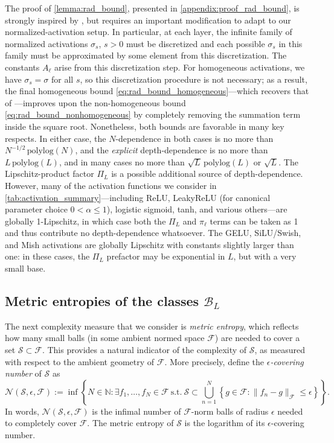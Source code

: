 \documentclass{article}
\def\cB{{\mathcal{B}}}
\def\cF{{\mathcal{F}}}
\def\cN{{\mathcal{N}}}
\def\cS{{\mathcal{S}}}
\def\bN{{\mathbb{N}}}
\begin{document}
The proof of \cref{lemma:rad_bound}, presented in \cref{appendix:proof_rad_bound}, is strongly inspired by \cite{golowich2018size}, but requires an important modification to adapt to our normalized-activation setup. In particular, at each layer, the infinite family of normalized activations $\sigma_s$, $s > 0$ must be discretized and each possible $\sigma_s$ in this family must be approximated by some element from this discretization. The constants $A_\ell$ arise from this discretization step. For homogeneous activations, we have $\sigma_s = \sigma$ for all $s$, so this discretization procedure is not necessary; as a result, the final homogeneous bound \eqref{eq:rad_bound_homogeneous}---which recovers that of \cite{golowich2018size}---improves upon the non-homogeneous bound \eqref{eq:rad_bound_nonhomogeneous} by completely removing the summation term inside the square root. Nonetheless, both bounds are favorable in many key respects. In either case, the $N$-dependence in both cases is no more than $N^{-1/2} \, \mathrm{polylog}(N)$, and the \textit{explicit} depth-dependence is no more than $L \, \mathrm{polylog}(L)$, and in many cases no more than $\sqrt{L} \, \mathrm{polylog}(L)$ or $\sqrt{L}$. The Lipschitz-product factor $\Pi_L$ is a possible additional source of depth-dependence. However, many of the activation functions we consider in \cref{tab:activation_summary}---including ReLU, LeakyReLU (for canonical parameter choice $0 < \alpha \leq 1$), logistic sigmoid, tanh, and various others---are globally 1-Lipschitz, in which case both the $\Pi_L$ and $\pi_\ell$ terms can be taken as 1 and thus contribute no depth-dependence whatsoever. The GELU, SiLU/Swish, and Mish activations are globally Lipschitz with constants slightly larger than one: in these cases, the $\Pi_L$ prefactor may be exponential in $L$, but with a very small base.

\subsection{Metric entropies of the classes $\cB_L$} \label{sec:metric_entropy}
The next complexity measure that we consider is \textit{metric entropy}, which reflects how many small balls (in some ambient normed space $\cF$) are needed to cover a set $\cS \subset \cF$. This provides a natural indicator of the complexity of $\cS$, as measured with respect to the ambient geometry of $\cF$. More precisely, define the \textit{$\epsilon$-covering number} of $\cS$ as
\begin{equation} \label{eq:covering_number}
    \cN(\cS, \epsilon, \cF) := \inf \left\{ N \in \bN: \exists f_1, \dots, f_N \in \cF \ \textrm{s.t.} \ \cS \subset \bigcup_{n=1}^N \left\{ g \in \cF: \| f_n - g \|_{\cF} \leq \epsilon \right\} \right\}.
\end{equation}
In words, $\cN(\cS, \epsilon, \cF)$ is the infimal number of $\cF$-norm balls of radius $\epsilon$ needed to completely cover $\cF$. The metric entropy of $\cS$ is the logarithm of its $\epsilon$-covering number.
\end{document}
